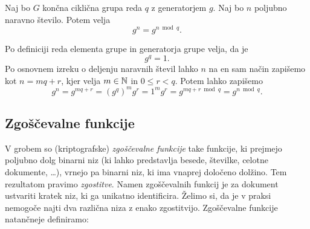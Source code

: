 \begin{trditev}
\label{trd:exp-mod-ord}
    Naj bo $G$ končna ciklična grupa reda $q$ z generatorjem $g$. Naj bo $n$ poljubno naravno število.
    Potem velja
    $$
    g^n = g^{n \bmod q}.
    $$
\end{trditev}
\begin{dokaz}
    Po definiciji reda elementa grupe in generatorja grupe velja, da je
    $$
    g^q = 1.
    $$
    Po osnovnem izreku o deljenju naravnih števil lahko $n$ na en sam način zapišemo kot $n = mq + r$,
    kjer velja $m \in \mathbb N$ in $0 \leq r < q$. Potem lahko zapišemo
    $$
    g^n = g^{mq + r} = (g^q)^m g^r = 1^m g^r = g^{mq + r \bmod q} = g^{n \bmod q}.
    $$
\end{dokaz}

\subsection{Zgoščevalne funkcije}
V grobem so (kriptografske) \textit{zgoščevalne funkcije} take funkcije, ki prejmejo poljubno dolg binarni
niz (ki lahko predstavlja besede, številke, celotne dokumente, \dots), vrnejo pa binarni niz, ki ima
vnaprej določeno dolžino. Tem rezultatom pravimo \textit{zgostitve}. Namen zgoščevalnih funkcij je
za dokument ustvariti kratek niz, ki ga unikatno identificira. Želimo si, da je v praksi nemogoče
najti dva različna niza z enako zgostitvijo. Zgoščevalne funkcije natančneje definiramo:

